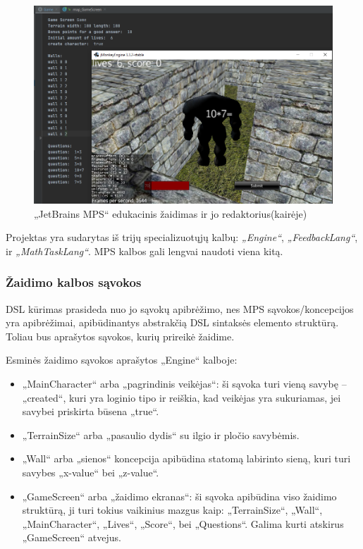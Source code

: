 \documentclass{VUMIFPSkursinis}
\begin{document}
\begin{figure}[H]
    \centering
    \includegraphics[scale=0.5]{img/galutinisProjektas.png}
    \caption{„JetBrains MPS“ edukacinis žaidimas ir jo redaktorius(kairėje)}
    \label{img:galutinisProjektas}
\end{figure}

Projektas yra sudarytas iš trijų specializuotųjų kalbų: \textit{„Engine“}, \textit{„FeedbackLang“}, ir \textit{„MathTaskLang“}. MPS kalbos gali lengvai naudoti viena kitą.

\subsubsection{Žaidimo kalbos sąvokos}

DSL kūrimas prasideda nuo jo sąvokų apibrėžimo, nes MPS sąvokos/koncepcijos yra apibrėžimai, apibūdinantys abstrakčią DSL sintaksės elemento struktūrą. Toliau bus aprašytos sąvokos, kurių prireikė žaidime.

Esminės žaidimo sąvokos aprašytos „Engine“ kalboje:
\begin{itemize}
\item „MainCharacter“ arba „pagrindinis veikėjas“: ši sąvoka turi vieną savybę -- „created“, kuri yra loginio tipo ir reiškia, kad veikėjas yra sukuriamas, jei savybei priskirta būsena „true“.
\item „TerrainSize“ arba „pasaulio dydis“ su ilgio ir pločio savybėmis.
\item „Wall“ arba „sienos“ koncepcija apibūdina statomą labirinto sieną, kuri turi savybes „x-value“ bei „z-value“. 
\item „GameScreen“ arba „žaidimo ekranas“: ši sąvoka apibūdina viso žaidimo struktūrą, ji turi tokius vaikinius mazgus kaip: „TerrainSize“, „Wall“, „MainCharacter“, „Lives“, „Score“, bei „Questions“. Galima kurti atskirus „GameScreen“ atvejus.
\end{itemize}
\end{document}
